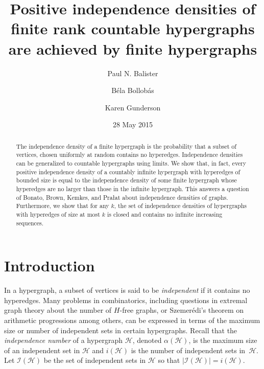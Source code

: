 \documentclass[11pt,reqno]{amsart}
\title[Independence densities of countable hypergraphs]{Positive independence densities of finite rank countable hypergraphs are achieved by finite hypergraphs}
\author[P. N. Balister]{Paul N. Balister}
\author[B. Bollob\'as]{B\'ela Bollob\'as}
\author[K. Gunderson]{Karen Gunderson}
\date{28 May 2015}
\theoremstyle{definition}
\begin{document}
\begin{abstract}
The independence density of a finite hypergraph is the probability that a subset of vertices, chosen uniformly at random contains no hyperedges.  Independence densities can be generalized to countable hypergraphs using limits.  We show that, in fact, every positive independence density of a countably infinite hypergraph with hyperedges of bounded size is equal to the independence density of some finite hypergraph whose hyperedges are no larger than those in the infinite hypergraph.  This answers a question of Bonato, Brown, Kemkes, and Pra{\l}at about independence densities of graphs.  Furthermore, we show that for any $k$, the set of independence densities of hypergraphs with hyperedges of size at most $k$ is closed and contains no infinite increasing sequences.
\end{abstract}

\maketitle

\section{Introduction}\label{sec:intro}

In a hypergraph, a subset of vertices is said to be \emph{independent} if it contains no hyperedges. Many problems in combinatorics, including questions in extremal graph theory about the number of $H$-free graphs, or Szemer\'edi's theorem on arithmetic progressions among others, can be expressed in terms of the maximum size or number of independent sets in certain hypergraphs.  Recall that the \emph{independence number} of a hypergraph $\mathcal{H}$, denoted $\alpha(\mathcal{H})$, is the maximum size of an independent set in $\mathcal{H}$ and $i(\mathcal{H})$ is the number of independent sets in~$\mathcal{H}$.  Let $\mathcal{I}(\mathcal{H})$ be the set of independent sets in $\mathcal{H}$ so that $|\mathcal{I}(\mathcal{H})| = i(\mathcal{H})$.
\end{document}
